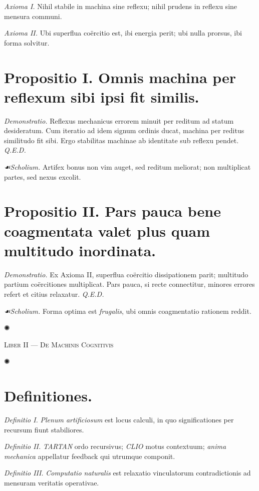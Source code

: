 \documentclass[12pt]{article}
\newcommand{\orn}{\centerline{\large ✺}}
\newcommand{\scholia}{\textit{☙\;}}
\newcommand{\divider}{\vspace{1em}\orn\vspace{1em}}
\newcommand{\Liber}[1]{\vspace{1ex}\begin{center}\Large\textsc{Liber #1}\end{center}\vspace{-0.5ex}\orn\vspace{0.5ex}}
\begin{document}
\textit{Axioma I.} \; Nihil stabile in machina sine reflexu; nihil prudens in reflexu sine mensura communi.

\textit{Axioma II.} \; Ubi superflua coërcitio est, ibi energia perit; ubi nulla prorsus, ibi forma solvitur.

\section*{Propositio I. \; Omnis machina per reflexum sibi ipsi fit similis.}

\textit{Demonstratio.} Reflexus mechanicus errorem minuit per reditum ad statum desideratum. Cum iteratio ad idem signum ordinis ducat, machina per reditus similitudo fit sibi. Ergo stabilitas machinae ab identitate sub reflexu pendet. \textit{Q.E.D.}

\textit{\scholia Scholium.} Artifex bonus non vim auget, sed reditum meliorat; non multiplicat partes, sed nexus excolit.

\section*{Propositio II. \; Pars pauca bene coagmentata valet plus quam multitudo inordinata.}

\textit{Demonstratio.} Ex Axioma II, superflua coërcitio dissipationem parit; multitudo partium coërcitiones multiplicat. Pars pauca, si recte connectitur, minores errores refert et citius relaxatur. \textit{Q.E.D.}

\textit{\scholia Scholium.} Forma optima est \textit{frugalis}, ubi omnis coagmentatio rationem reddit.

\divider

\Liber{II — De Machinis Cognitivis}

\section*{Definitiones.}

\textit{Definitio I.} \; \textit{Plenum artificiosum} est locus calculi, in quo significationes per recursum fiunt stabiliores.

\textit{Definitio II.} \; \textit{TARTAN} ordo recursivus; \textit{CLIO} motus contextuum; \textit{anima mechanica} appellatur feedback qui utrumque componit.

\textit{Definitio III.} \; \textit{Computatio naturalis} est relaxatio vinculatorum contradictionis ad mensuram veritatis operativae.
\end{document}
